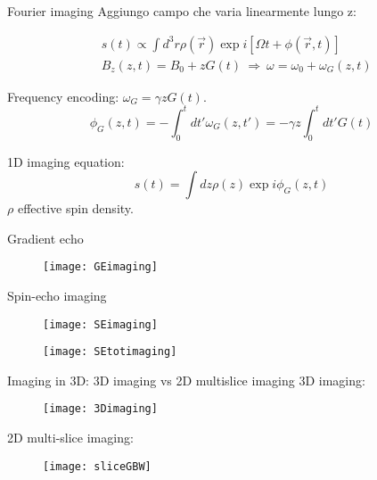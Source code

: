 \begin{frame}{Fourier imaging}
Aggiungo campo che varia linearmente lungo z:

\begin{align*}
&s(t)\propto\int d^3 r\rho(\vec{r})\exp{i[\Omega t+\phi(\vec{r},t)]}\\
&B_z(z,t)=B_0+zG(t)\ \Rightarrow\ \omega=\omega_0+\omega_G(z,t)
\end{align*}

Frequency encoding: $\omega_G=\gamma zG(t)$.
\begin{equation*}
\phi_G(z,t)=-\int_0^td t'\omega_G(z,t')=-\gamma z\int_0^td t'G(t)
\end{equation*}

1D imaging equation:
\begin{equation*}
s(t)=\int d z\rho(z)\exp{i\phi_G(z,t)}
\end{equation*}
$\rho$ effective spin density.

\end{frame}

\begin{frame}{Gradient echo}
\begin{figure}[!ht]\texttt{[image: GEimaging]}\end{figure}
\end{frame}

\begin{frame}[allowframebreaks]{Spin-echo imaging}
\begin{figure}[!ht]\texttt{[image: SEimaging]}\end{figure}
\begin{figure}[!ht]\texttt{[image: SEtotimaging]}\end{figure}
\end{frame}

\begin{frame}[allowframebreaks]{Imaging in 3D: 3D imaging  vs 2D multislice imaging}
3D imaging:
\begin{figure}[!ht]\texttt{[image: 3Dimaging]}\label{fig:3Dimaging}\end{figure}

2D multi-slice imaging:
\begin{figure}[!ht]\texttt{[image: sliceGBW]}\label{fig:sliceGBW}\end{figure}
\end{frame}

